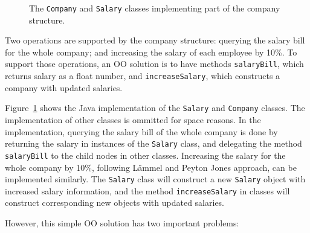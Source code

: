 \begin{figure}[tb]
\vspace{-.1in}
\caption{The \lstinline{Company} and \lstinline{Salary} classes
  implementing part of the company structure.}
\label{oop_company}
\end{figure}

Two operations are supported by the company structure: querying the
salary bill for the whole company; and increasing the salary of each
employee by 10\%. To support those operations, an OO solution is to
have methods \lstinline{salaryBill}, which returns salary as a float
number, and \lstinline{increaseSalary}, which constructs a company
with updated salaries.

Figure~\ref{oop_company} shows the Java implementation of the
\lstinline{Salary} and \lstinline{Company} classes. The implementation
of other classes is ommitted for space reasons.  In the
implementation, querying the salary bill of the whole company is done
by returning the salary in instances of the \lstinline{Salary} class,
and delegating the method \lstinline{salaryBill} to the child nodes in
other classes. Increasing the salary for the whole company by 10\%,
following L\"ammel and Peyton Jones approach, can be implemented
similarly. The \lstinline{Salary} class will construct a new
\lstinline{Salary} object with increased salary information, and
the method \lstinline{increaseSalary} in classes will
construct corresponding new objects with updated salaries.

However, this simple OO solution has two important problems:

